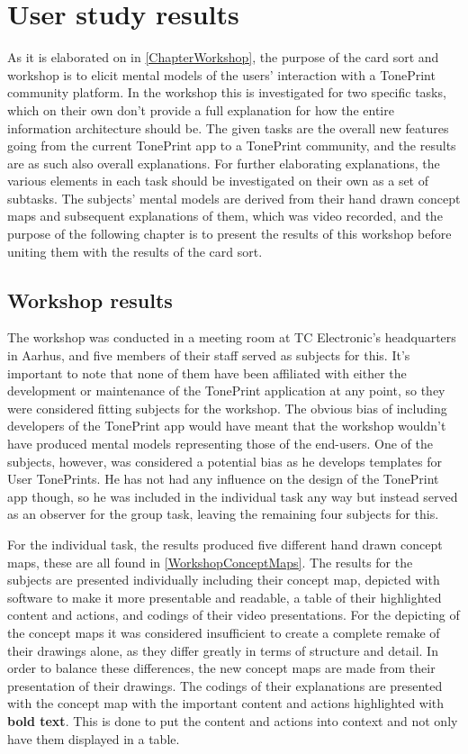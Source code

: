 \chapter{User study results}
\label{InformationAchitectureResults}
As it is elaborated on in \autoref{ChapterWorkshop}, the purpose of the card sort and workshop is to elicit mental models of the users' interaction with a TonePrint community platform. In the workshop this is investigated for two specific tasks, which on their own don't provide a full explanation for how the entire information architecture should be. The given tasks are the overall new features going from the current TonePrint app to a TonePrint community, and the results are as such also overall explanations. For further elaborating explanations, the various elements in each task should be investigated on their own as a set of subtasks. The subjects' mental models are derived from their hand drawn concept maps and subsequent explanations of them, which was video recorded, and the purpose of the following chapter is to present the results of this workshop before uniting them with the results of the card sort.

\section{Workshop results}
\label{WorkshopResults}
The workshop was conducted in a meeting room at TC Electronic's headquarters in Aarhus, and five members of their staff served as subjects for this. It's important to note that none of them have been affiliated with either the development or maintenance of the TonePrint application at any point, so they were considered fitting subjects for the workshop. The obvious bias of including developers of the TonePrint app would have meant that the workshop wouldn't have produced mental models representing those of the end-users. One of the subjects, however, was considered a potential bias as he develops templates for User TonePrints. He has not had any influence on the design of the TonePrint app though, so he was included in the individual task any way but instead served as an observer for the group task, leaving the remaining four subjects for this.

For the individual task, the results produced five different hand drawn concept maps, these are all found in \autoref{WorkshopConceptMaps}. The results for the subjects are presented individually including their concept map, depicted with software to make it more presentable and readable, a table of their highlighted content and actions, and codings of their video presentations. For the depicting of the concept maps it was considered insufficient to create a complete remake of their drawings alone, as they differ greatly in terms of structure and detail. In order to balance these differences, the new concept maps are made from their presentation of their drawings. The codings of their explanations are presented with the concept map with the important content and actions highlighted with \textbf{bold text}. This is done to put the content and actions into context and not only have them displayed in a table.

